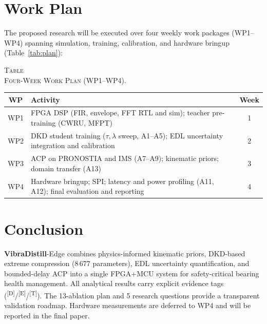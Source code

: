 \documentclass[conference]{IEEEtran}
\newcommand{\evD}{\textsuperscript{\textcolor{derived}{[D]}}\xspace}
\newcommand{\evE}{\textsuperscript{\textcolor{estimated}{[E]}}\xspace}
\newcommand{\evT}{\textsuperscript{\textcolor{target}{[T]}}\xspace}
\newcommand{\VD}{\textsf{\textbf{VibraDistill}}\xspace}
\begin{document}
\section{Work Plan}
\label{sec:plan}

The proposed research will be executed over four weekly work packages
(WP1--WP4) spanning simulation, training, calibration, and hardware
bringup (Table~\ref{tab:plan}):

\par\smallskip
\noindent
\begin{minipage}{\columnwidth}
  \centering
  \label{tab:plan}
  \small
  \textsc{Table~}\\[2pt]
  \textsc{Four-Week Work Plan (WP1--WP4).}
  \par\vspace{4pt}
  \setlength{\tabcolsep}{4pt}
  \begin{tabular}{@{}cL{5.4cm}c@{}}
    \toprule
    \textbf{WP} & \textbf{Activity} & \textbf{Week}\\
    \midrule
    WP1 & FPGA DSP (FIR, envelope, FFT RTL and sim);
          teacher pre-training (CWRU, MFPT) & 1\\
    WP2 & DKD student training ($\tau,\lambda$ sweep, A1--A5);
          EDL uncertainty integration and calibration & 2\\
    WP3 & ACP on PRONOSTIA and IMS (A7--A9);
          kinematic priors; domain transfer (A13) & 3\\
    WP4 & Hardware bringup; SPI; latency and power profiling
          (A11, A12); final evaluation and reporting & 4\\
    \bottomrule
  \end{tabular}
\end{minipage}
\par\medskip

\section{Conclusion}
\label{sec:conclusion}

\VD-Edge combines physics-informed kinematic priors, DKD-based extreme
compression (8\,677 parameters), EDL uncertainty quantification,
and bounded-delay ACP into a single FPGA+MCU system for safety-critical
bearing health management.
All analytical results carry explicit evidence tags (\evD/\evE/\evT).
The 13-ablation plan and 5 research questions provide a transparent
validation roadmap.
Hardware measurements are deferred to WP4 and will be reported in
the final paper.
\end{document}
